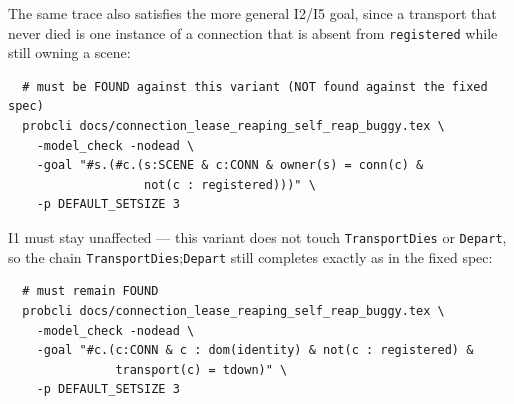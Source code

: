 \documentclass[a4paper,10pt,fleqn]{article}
\begin{document}
The same trace also satisfies the more general I2/I5 goal, since a
transport that never died is one instance of a connection that is
absent from \texttt{registered} while still owning a scene:

\begin{verbatim}
  # must be FOUND against this variant (NOT found against the fixed spec)
  probcli docs/connection_lease_reaping_self_reap_buggy.tex \
    -model_check -nodead \
    -goal "#s.(#c.(s:SCENE & c:CONN & owner(s) = conn(c) &
                   not(c : registered)))" \
    -p DEFAULT_SETSIZE 3
\end{verbatim}

I1 must stay unaffected --- this variant does not touch
\texttt{TransportDies} or \texttt{Depart}, so the chain
\texttt{TransportDies};\texttt{Depart} still completes exactly as in the
fixed spec:

\begin{verbatim}
  # must remain FOUND
  probcli docs/connection_lease_reaping_self_reap_buggy.tex \
    -model_check -nodead \
    -goal "#c.(c:CONN & c : dom(identity) & not(c : registered) &
               transport(c) = tdown)" \
    -p DEFAULT_SETSIZE 3
\end{verbatim}
\end{document}
